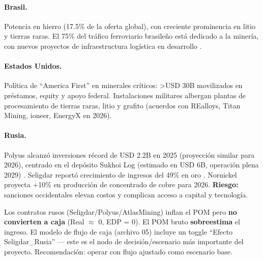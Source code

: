 \paragraph{Brasil.} Potencia en hierro (17.5\% de la oferta global), con creciente prominencia en litio y tierras raras. El 75\% del tráfico ferroviario brasileño está dedicado a la minería, con nuevos proyectos de infraestructura logística en desarrollo \cite{bnamericas2026}.

\paragraph{Estados Unidos.} Política de ``America First'' en minerales críticos: >USD 30B movilizados en préstamos, equity y apoyo federal. Instalaciones militares albergan plantas de procesamiento de tierras raras, litio y grafito (acuerdos con REalloys, Titan Mining, ioneer, EnergyX en 2026).

\paragraph{Rusia.} Polyus alcanzó inversiones récord de USD 2.2B en 2025 (proyección similar para 2026), centrado en el depósito Sukhoi Log (estimado en USD 6B, operación plena 2029) \cite{polyus2025}. Seligdar reportó crecimiento de ingresos del 49\% en oro \cite{seligdar2025}. Nornickel proyecta +10\% en producción de concentrado de cobre para 2026. \textbf{Riesgo:} sanciones occidentales elevan costos y complican acceso a capital y tecnología.

\begin{riskbox}
Los contratos rusos (Seligdar/Polyus/AtlasMining) inflan el POM pero \textbf{no convierten a caja} (Real $\approx$ 0, EDP = 0). El POM bruto \textbf{sobreestima} el ingreso. El modelo de flujo de caja (archivo 05) incluye un toggle ``Efecto Seligdar\_Rusia'' — este es el nodo de decisión/escenario más importante del proyecto. Recomendación: operar con flujo ajustado como escenario base.
\end{riskbox}

